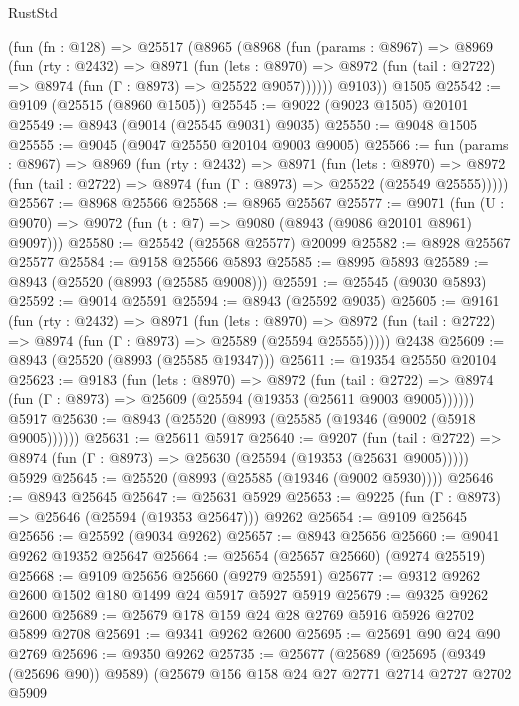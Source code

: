 \begin{lexlean}{RustStd}
\begin{coremodule}
    (fun (fn : @128) =>
    @25517
      (@8965
        (@8968
          (fun (params : @8967) =>
          @8969
            (fun (rty : @2432) =>
            @8971
              (fun (lets : @8970) =>
              @8972 (fun (tail : @2722) => @8974 (fun (Γ : @8973) => @25522 @9057))))))
        @9103))
    @1505
@25542 := @9109 (@25515 (@8960 @1505))
@25545 := @9022 (@9023 @1505) @20101
@25549 := @8943 (@9014 (@25545 @9031) @9035)
@25550 := @9048 @1505
@25555 := @9045 (@9047 @25550 @20104 @9003 @9005)
@25566 := fun (params : @8967) =>
  @8969
    (fun (rty : @2432) =>
    @8971
      (fun (lets : @8970) =>
      @8972 (fun (tail : @2722) => @8974 (fun (Γ : @8973) => @25522 (@25549 @25555)))))
@25567 := @8968 @25566
@25568 := @8965 @25567
@25577 := @9071
    (fun (U : @9070) => @9072 (fun (t : @7) => @9080 (@8943 (@9086 @20101 @8961) @9097)))
@25580 := @25542 (@25568 @25577) @20099
@25582 := @8928 @25567 @25577
@25584 := @9158 @25566 @5893
@25585 := @8995 @5893
@25589 := @8943 (@25520 (@8993 (@25585 @9008)))
@25591 := @25545 (@9030 @5893)
@25592 := @9014 @25591
@25594 := @8943 (@25592 @9035)
@25605 := @9161
    (fun (rty : @2432) =>
    @8971
      (fun (lets : @8970) =>
      @8972 (fun (tail : @2722) => @8974 (fun (Γ : @8973) => @25589 (@25594 @25555)))))
    @2438
@25609 := @8943 (@25520 (@8993 (@25585 @19347)))
@25611 := @19354 @25550 @20104
@25623 := @9183
    (fun (lets : @8970) =>
    @8972
      (fun (tail : @2722) =>
      @8974 (fun (Γ : @8973) => @25609 (@25594 (@19353 (@25611 @9003 @9005))))))
    @5917
@25630 := @8943 (@25520 (@8993 (@25585 (@19346 (@9002 (@5918 @9005))))))
@25631 := @25611 @5917
@25640 := @9207
    (fun (tail : @2722) => @8974 (fun (Γ : @8973) => @25630 (@25594 (@19353 (@25631 @9005)))))
    @5929
@25645 := @25520 (@8993 (@25585 (@19346 (@9002 @5930))))
@25646 := @8943 @25645
@25647 := @25631 @5929
@25653 := @9225 (fun (Γ : @8973) => @25646 (@25594 (@19353 @25647))) @9262
@25654 := @9109 @25645
@25656 := @25592 (@9034 @9262)
@25657 := @8943 @25656
@25660 := @9041 @9262 @19352 @25647
@25664 := @25654 (@25657 @25660) (@9274 @25519)
@25668 := @9109 @25656 @25660 (@9279 @25591)
@25677 := @9312 @9262 @2600 @1502 @180 @1499 @24 @5917 @5927 @5919
@25679 := @9325 @9262 @2600
@25689 := @25679 @178 @159 @24 @28 @2769 @5916 @5926 @2702 @5899 @2708
@25691 := @9341 @9262 @2600
@25695 := @25691 @90 @24 @90 @2769
@25696 := @9350 @9262
@25735 := @25677
    (@25689
      (@25695 (@9349 (@25696 @90)) @9589)
      (@25679
        @156
        @158
        @24
        @27
        @2771
        @2714
        @2727
        @2702
        @5909

\end{coremodule}
\end{lexlean}
